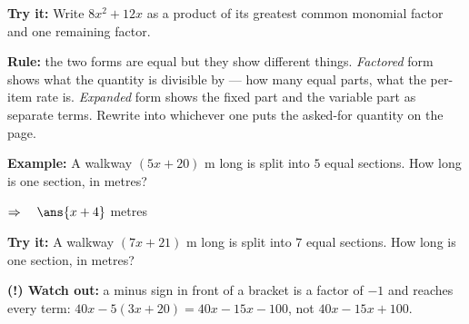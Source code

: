 \documentclass[12pt]{article}
\begin{document}
\begin{tryitbox}
\textbf{Try it:} \quad Write $8x^2 + 12x$ as a product of its greatest common monomial factor and
one remaining factor.\\[2pt]
\end{tryitbox}


\begin{formulabox}
\textbf{Rule:} the two forms are equal but they show different things.
\emph{Factored} form shows what the quantity is divisible by --- how many equal parts, what the
per-item rate is. \emph{Expanded} form shows the fixed part and the variable part as separate
terms. Rewrite into whichever one puts the asked-for quantity on the page.
\end{formulabox}

\begin{examplebox}
\textbf{Example:} \quad A walkway $(5x + 20)$ m long is split into $5$ equal sections. How long is
one section, in metres?

$\Rightarrow\quad \ans{x + 4}$ metres
\end{examplebox}

\begin{tryitbox}
\textbf{Try it:} \quad A walkway $(7x + 21)$ m long is split into $7$ equal sections. How long is
one section, in metres?\\[2pt]
\end{tryitbox}

\begin{watchoutbox}
\textbf{(!) Watch out:} a minus sign in front of a bracket is a factor of $-1$ and reaches every
term: $40x - 5(3x + 20) = 40x - 15x - 100$, not $40x - 15x + 100$.
\end{watchoutbox}
\end{document}
